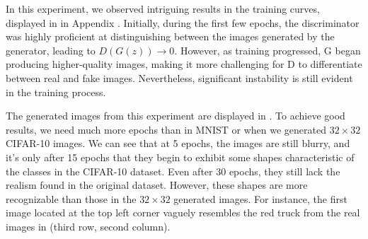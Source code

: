 In this experiment, we observed intriguing results in the training curves, displayed in  in Appendix . Initially, during the first few epochs, the discriminator was highly proficient at distinguishing between the images generated by the generator, leading to $D(G(z)) \rightarrow 0$. However, as training progressed, G began producing higher-quality images, making it more challenging for D to differentiate between real and fake images. Nevertheless, significant instability is still evident in the training process.

The generated images from this experiment are displayed in . To achieve good results, we need much more epochs than in MNIST or when we generated $32 \times 32$ CIFAR-10 images. We can see that at 5 epochs, the images are still blurry, and it's only after 15 epochs that they begin to exhibit some shapes characteristic of the classes in the CIFAR-10 dataset. Even after 30 epochs, they still lack the realism found in the original dataset. However, these shapes are more recognizable than those in the $32 \times 32$ generated images. For instance, the first image located at the top left corner vaguely resembles the red truck from the real images in  (third row, second column).

